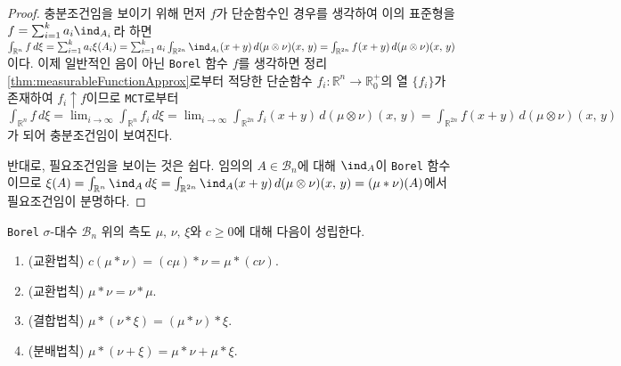 \begin{proof}
    충분조건임을 보이기 위해 먼저 $f$가 단순함수인 경우를 생각하여 이의 표준형을 $f=\sum_{i=1}^ka_i\ind_{A_i}$라 하면 $\int_{\mathbb{R}^n}f\,d\xi=\sum_{i=1}^ka_i\xi(A_i)=\sum_{i=1}^ka_i\int_{\mathbb{R}^{2n}}\ind_{A_i}(x+y)\,d(\mu\otimes\nu)(x,\,y)=\int_{\mathbb{R}^{2n}}f(x+y)\,d(\mu\otimes\nu)(x,\,y)$이다. 이제 일반적인 음이 아닌 \texttt{Borel} 함수 $f$를 생각하면 정리 \ref{thm:measurableFunctionApprox}로부터 적당한 단순함수 $f_i:\mathbb{R}^n\to\mathbb{R}^+_0$의 열 $\{f_i\}$가 존재하여 $f_i\uparrow f$이므로 \texttt{MCT}로부터 $\int_{\mathbb{R}^n}f\,d\xi=\lim_{i\to\infty}\int_{\mathbb{R}^n}f_i\,d\xi=\lim_{i\to\infty}\int_{\mathbb{R}^{2n}}f_i(x+y)\,d(\mu\otimes\nu)(x,\,y)=\int_{\mathbb{R}^{2n}}f(x+y)\,d(\mu\otimes\nu)(x,\,y)$가 되어 충분조건임이 보여진다.

    반대로, 필요조건임을 보이는 것은 쉽다. 임의의 $A\in\mathcal{B}_n$에 대해 $\ind_A$이 \texttt{Borel} 함수이므로 $\xi(A)=\int_{\mathbb{R}^n}\ind_A\,d\xi=\int_{\mathbb{R}^{2n}}\ind_A(x+y)\,d(\mu\otimes\nu)(x,\,y)=(\mu*\nu)(A)$에서 필요조건임이 분명하다.
\end{proof}

\begin{theorem}
    \texttt{Borel} $\sigma$-대수 $\mathcal{B}_n$ 위의 측도 $\mu,\,\nu,\,\xi$와 $c\geq0$에 대해 다음이 성립한다.
    \begin{enumerate}
        \item (교환법칙) $c(\mu*\nu)=(c\mu)*\nu=\mu*(c\nu)$.
        \item (교환법칙) $\mu*\nu=\nu*\mu$.
        \item (결합법칙) $\mu*(\nu*\xi)=(\mu*\nu)*\xi$.
        \item (분배법칙) $\mu*(\nu+\xi)=\mu*\nu+\mu*\xi$.
    \end{enumerate}
\end{theorem}

